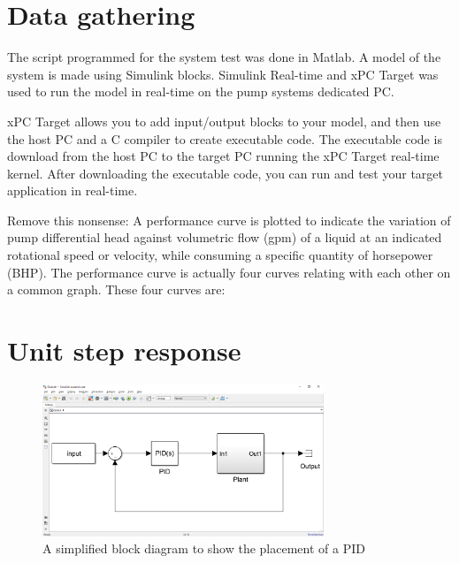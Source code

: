 

\section{Data gathering}\label{sec:data_gathering}
The script programmed for the system test was done in Matlab. 
A model of the system is made using Simulink blocks. 
Simulink Real-time and xPC Target was used to run the model in real-time on 
the pump systems dedicated PC. 




xPC Target allows you to add input/output blocks to your model, and then use the host 
PC and a C compiler to create executable code. The executable code is download 
from the host PC to the target PC running the xPC Target real-time kernel. 
After downloading the executable code, you can run and test your target 
application in real-time. 


Remove this nonsense:
A performance curve is plotted to indicate the variation of pump differential head against volumetric flow (gpm) of a liquid at an indicated rotational speed or velocity, while consuming a specific quantity of horsepower (BHP). The performance curve is actually four curves relating with each other on a common graph. These four curves are:

\section{Unit step response}
\begin{figure}[H]
    \centering
    \includegraphics[width=0.75\textwidth]{figures/04ExperimentsAndLabWork/CLblock.png}
    \caption{A simplified block diagram to show the placement of a PID}
	\label{fig:PIDplace}
\end{figure}

